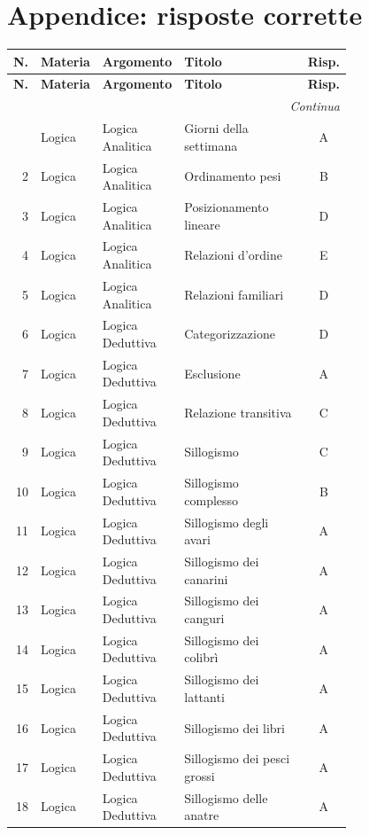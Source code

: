 \documentclass[20pt, a4paper]{article}
\begin{document}
\section*{Appendice: risposte corrette}
\begin{longtable}{@{}r>{\raggedright\arraybackslash}p{0.14\linewidth}>{\raggedright\arraybackslash}p{0.20\linewidth}>{\raggedright\arraybackslash}p{0.42\linewidth}c@{}}
\toprule
\textbf{N.} & \textbf{Materia} & \textbf{Argomento} & \textbf{Titolo} & \textbf{Risp.} \\
\midrule
\endfirsthead
\toprule
\textbf{N.} & \textbf{Materia} & \textbf{Argomento} & \textbf{Titolo} & \textbf{Risp.} \\
\midrule
\endhead
\midrule
\multicolumn{5}{r}{\footnotesize\textit{Continua}} \\
\endfoot
\bottomrule
\endlastfoot
1 & Logica & Logica Analitica & Giorni della settimana & A \\
2 & Logica & Logica Analitica & Ordinamento pesi & B \\
3 & Logica & Logica Analitica & Posizionamento lineare & D \\
4 & Logica & Logica Analitica & Relazioni d'ordine & E \\
5 & Logica & Logica Analitica & Relazioni familiari & D \\
6 & Logica & Logica Deduttiva & Categorizzazione & D \\
7 & Logica & Logica Deduttiva & Esclusione & A \\
8 & Logica & Logica Deduttiva & Relazione transitiva & C \\
9 & Logica & Logica Deduttiva & Sillogismo & C \\
10 & Logica & Logica Deduttiva & Sillogismo complesso & B \\
11 & Logica & Logica Deduttiva & Sillogismo degli avari & A \\
12 & Logica & Logica Deduttiva & Sillogismo dei canarini & A \\
13 & Logica & Logica Deduttiva & Sillogismo dei canguri & A \\
14 & Logica & Logica Deduttiva & Sillogismo dei colibrì & A \\
15 & Logica & Logica Deduttiva & Sillogismo dei lattanti & A \\
16 & Logica & Logica Deduttiva & Sillogismo dei libri & A \\
17 & Logica & Logica Deduttiva & Sillogismo dei pesci grossi & A \\
18 & Logica & Logica Deduttiva & Sillogismo delle anatre & A \\

\end{longtable}
\end{document}
